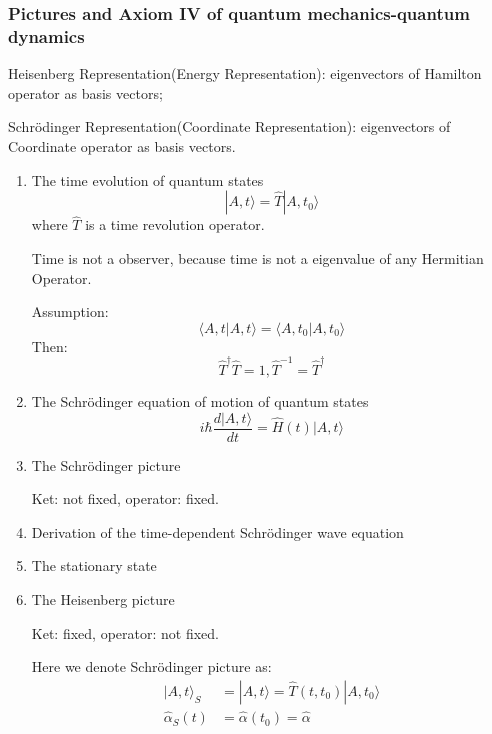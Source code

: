 \documentclass[12pt]{article}
\numberwithin{equation}{section}
\begin{document}
\subsubsection{Pictures and Axiom IV of quantum mechanics-quantum dynamics}
	Heisenberg Representation(Energy Representation): eigenvectors of Hamilton operator as basis vectors; \par
	Schr\"{o}dinger Representation(Coordinate Representation): eigenvectors of Coordinate operator as basis vectors.
\begin{enumerate}
\item The time evolution of quantum states
	\begin{equation}
		|A, t\rangle = \hat{T}|A,t_0\rangle
	\end{equation}
	where $\hat{T}$ is a time revolution operator. \par
	Time is not a observer, because time is not a eigenvalue of any Hermitian Operator. \par
	Assumption: 
	\begin{equation}
		\langle A, t|A, t\rangle = \langle A, t_0|A, t_0\rangle
	\end{equation}
	Then:
	\begin{equation}
		\hat{T}^\dag\hat{T} = 1, 
		\hat{T}^{-1} = \hat{T}^\dag
	\end{equation}
\item The Schr\"{o}dinger equation of motion of quantum states
	\begin{equation}
		i\hbar\frac{d|A, t\rangle}{dt} = \hat{H}(t)|A, t\rangle
	\end{equation}
\item The Schr\"{o}dinger picture \par
	Ket: not fixed, operator: fixed.
\item Derivation of the time-dependent Schr\"{o}dinger wave equation
\item The stationary state 
\item The Heisenberg picture \par
	Ket: fixed, operator: not fixed. \par
	Here we denote Schr\"{o}dinger picture as:
	\begin{equation} \begin{split}
		|A, t\rangle_S &= |A, t\rangle = \hat{T}(t, t_0)|A,t_0\rangle \\
		\hat{\alpha}_S(t) &= \hat{\alpha}(t_0) = \hat{\alpha}
	\end{split} \end{equation}

\end{enumerate}
\end{document}
